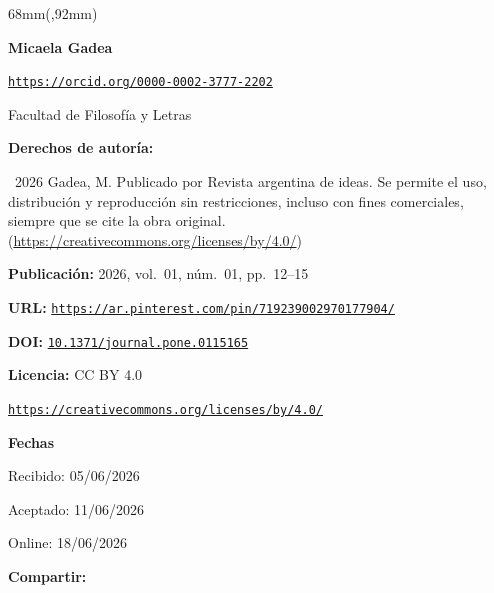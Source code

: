 \documentclass{article}
\newlength{\gbbloquex}
\begin{document}
\begin{textblock*}{68mm}(\gbbloquex,92mm)
{\setlength{\leftskip}{0pt}\setlength{\parindent}{0pt}%
\noindent\begin{minipage}[t]{68mm}
\sffamily\small\setlength{\parskip}{1pt}
{\bfseries\color{azulrevista}Micaela Gadea}\par
{\scriptsize\texttt{\href{https://orcid.org/0000-0002-3777-2202}{https://orcid.org/0000-0002-3777-2202}}}\par
Facultad de Filosofía y Letras\par
\vspace{6pt}
{\bfseries\color{azulrevista!70}Derechos de autor\'ia:}\par
\textcopyright\ 2026 Gadea, M. Publicado por Revista argentina de ideas. Se permite el uso, distribución y reproducción sin restricciones, incluso con fines comerciales, siempre que se cite la obra original. (\href{https://creativecommons.org/licenses/by/4.0/}{https://creativecommons.org/licenses/by/4.0/})\par\vspace{6pt}
{\bfseries\color{azulrevista!70}Publicación:} 2026, vol.~01, n\'um.~01, pp.~12--15\par\vspace{6pt}
{\bfseries\color{azulrevista!70}URL:} {\scriptsize\texttt{\href{https://ar.pinterest.com/pin/719239002970177904/}{https://ar.pinterest.com/pin/719239002970177904/}}}\par\vspace{6pt}
{\bfseries\color{azulrevista!70}DOI:} {\scriptsize\texttt{\href{https://doi.org/10.1371/journal.pone.0115165}{10.1371/journal.pone.0115165}}}\par\vspace{6pt}
{\bfseries\color{azulrevista!70}Licencia:} CC BY 4.0\par
{\scriptsize\texttt{\href{https://creativecommons.org/licenses/by/4.0/}{https://creativecommons.org/licenses/by/4.0/}}}\par
\vspace{6pt}
{\bfseries\color{azulrevista!70}Fechas}\par\vspace{2pt}
Recibido: 05/06/2026\par
Aceptado: 11/06/2026\par
Online: 18/06/2026\par
\vspace{6pt}
\vspace{6pt}
{\bfseries\color{azulrevista!70}Compartir:}\par\vspace{3pt}

\end{minipage}}
\end{textblock*}
\end{document}
